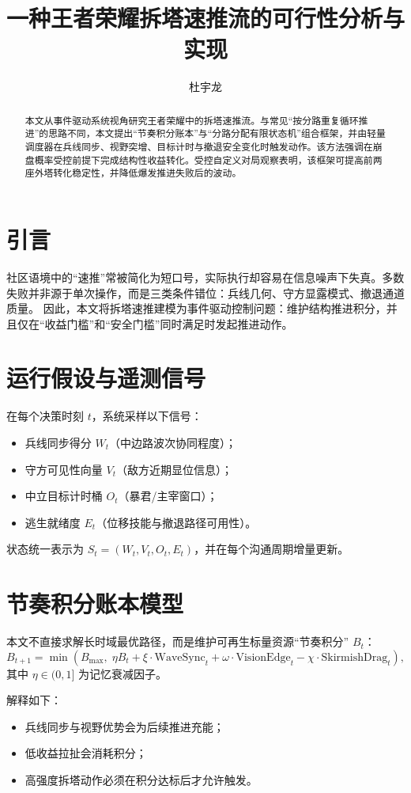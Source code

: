 \documentclass[runningheads]{llncs}
\title{一种王者荣耀拆塔速推流的可行性分析与实现}
\author{杜宇龙}
\institute{娱乐策略研究组\\
\email{contact@example.com}}
\begin{document}
\maketitle

\begin{abstract}
本文从事件驱动系统视角研究王者荣耀中的拆塔速推流。与常见“按分路重复循环推进”的思路不同，本文提出“节奏积分账本”与“分路分配有限状态机”组合框架，并由轻量调度器在兵线同步、视野突增、目标计时与撤退安全变化时触发动作。该方法强调在崩盘概率受控前提下完成结构性收益转化。受控自定义对局观察表明，该框架可提高前两座外塔转化稳定性，并降低爆发推进失败后的波动。
\end{abstract}

\section{引言}
社区语境中的“速推”常被简化为短口号，实际执行却容易在信息噪声下失真。多数失败并非源于单次操作，而是三类条件错位：兵线几何、守方显露模式、撤退通道质量。
因此，本文将拆塔速推建模为事件驱动控制问题：维护结构推进积分，并且仅在“收益门槛”和“安全门槛”同时满足时发起推进动作。

\section{运行假设与遥测信号}
在每个决策时刻 $t$，系统采样以下信号：
\begin{itemize}
\item 兵线同步得分 $W_t$（中边路波次协同程度）；
\item 守方可见性向量 $V_t$（敌方近期显位信息）；
\item 中立目标计时桶 $O_t$（暴君/主宰窗口）；
\item 逃生就绪度 $E_t$（位移技能与撤退路径可用性）。
\end{itemize}
状态统一表示为 $S_t=(W_t,V_t,O_t,E_t)$，并在每个沟通周期增量更新。

\section{节奏积分账本模型}
本文不直接求解长时域最优路径，而是维护可再生标量资源“节奏积分” $B_t$：
\[
B_{t+1}=\min\!\left(B_{\max},\;
\eta B_t
+\xi\cdot \mathrm{WaveSync}_t
+\omega\cdot \mathrm{VisionEdge}_t
-\chi\cdot \mathrm{SkirmishDrag}_t\right),
\]
其中 $\eta\in(0,1]$ 为记忆衰减因子。

解释如下：
\begin{itemize}
\item 兵线同步与视野优势会为后续推进充能；
\item 低收益拉扯会消耗积分；
\item 高强度拆塔动作必须在积分达标后才允许触发。
\end{itemize}
\end{document}
